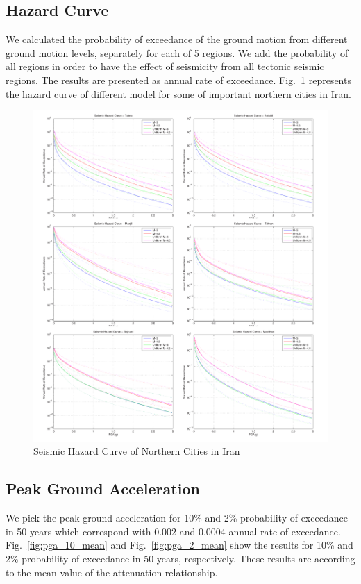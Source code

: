 \subsection{Hazard Curve}

We calculated the probability of exceedance of the ground motion from different ground motion levels, separately for each of 5 regions. We add the probability of all regions in order to have the effect of seismicity from all tectonic seismic regions. The results are presented as annual rate of exceedance. Fig.~\ref{fig:hazardcurve} represents the hazard curve of different model for some of important northern cities in Iran. 

\begin{figure} [!ht]
\centering
\includegraphics[scale=0.4]{figures/pdf/HazardCurve.pdf} 
\caption{Seismic Hazard Curve of Northern Cities in Iran}
\label{fig:hazardcurve}
\end{figure}

\subsection{Peak Ground Acceleration}

We pick the peak ground acceleration for 10\% and 2\% probability of exceedance in 50 years which correspond with 0.002 and 0.0004 annual rate of exceedance. Fig.~\ref{fig:pga_10_mean} and Fig.~\ref{fig:pga_2_mean} show the results for 10\% and 2\% probability of exceedance in 50 years, respectively. These results are according to the mean value of the attenuation relationship.

